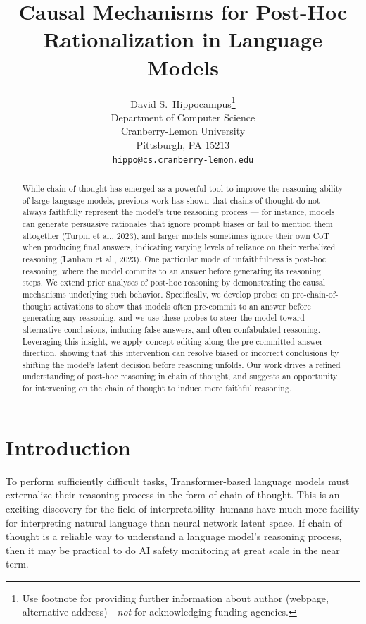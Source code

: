 \documentclass{article}
\title{Causal Mechanisms for Post-Hoc Rationalization in Language Models}
\author{%
  David S.~Hippocampus\thanks{Use footnote for providing further information
    about author (webpage, alternative address)---\emph{not} for acknowledging
    funding agencies.} \\
  Department of Computer Science\\
  Cranberry-Lemon University\\
  Pittsburgh, PA 15213 \\
  \texttt{hippo@cs.cranberry-lemon.edu} \\
}
\begin{document}
\maketitle


\begin{abstract}
  While chain of thought has emerged as a powerful tool to improve the reasoning ability of large language models, previous work has shown that chains of thought do not always faithfully represent the model's true reasoning process — for instance, models can generate persuasive rationales that ignore prompt biases or fail to mention them altogether (Turpin et al., 2023), and larger models sometimes ignore their own CoT when producing final answers, indicating varying levels of reliance on their verbalized reasoning (Lanham et al., 2023). One particular mode of unfaithfulness is post-hoc reasoning, where the model commits to an answer before generating its reasoning steps. We extend prior analyses of post-hoc reasoning by demonstrating the causal mechanisms underlying such behavior. Specifically, we develop probes on pre-chain-of-thought activations to show that models often pre-commit to an answer before generating any reasoning, and we use these probes to steer the model toward alternative conclusions, inducing false answers, and often confabulated reasoning. Leveraging this insight, we apply concept editing along the pre-committed answer direction, showing that this intervention can resolve biased or incorrect conclusions by shifting the model's latent decision before reasoning unfolds. Our work drives a refined understanding of post-hoc reasoning in chain of thought, and suggests an opportunity for intervening on the chain of thought to induce more faithful reasoning.
\end{abstract}

\section{Introduction}

To perform sufficiently difficult tasks, Transformer-based language models must externalize their reasoning process in the form of chain of thought. 
This is an exciting discovery for the field of interpretability--humans have much more facility for interpreting natural language than neural network latent space. 
If chain of thought is a reliable way to understand a language model's reasoning process, then it may be practical to do AI safety monitoring at great scale in the near term.
\end{document}
